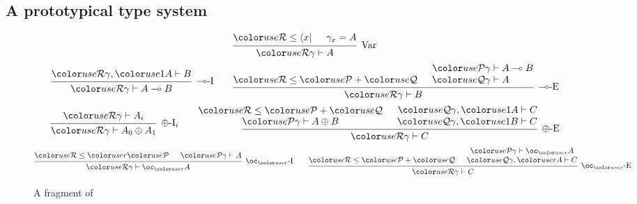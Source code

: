 \subsection{A prototypical type system}

\begin{figure}
  \begin{displaymath}
    \begin{prooftree}
      \hypo{\grR \leq \bra x}
      \hypo{\gamma_x = A}
      \infer2[Var]{\grR\gamma \vdash A}
    \end{prooftree}
  \end{displaymath}
  \begin{displaymath}
    \begin{prooftree}
      \hypo{\grR\gamma, \gr1A \vdash B}
      \infer1[$\multimap$-I]{\grR\gamma \vdash A \multimap B}
    \end{prooftree}
    \qquad
    \begin{prooftree}
      \hypo{\grR \leq \grP + \grQ}
      \hypo{\grP\gamma &\vdash A \multimap B}
      \infer[no rule]1{\grQ\gamma &\vdash A \phantom{{} \multimap B}}
      \infer2[$\multimap$-E]{\grR\gamma \vdash B}
    \end{prooftree}
  \end{displaymath}
  \begin{displaymath}
    \begin{prooftree}
      \hypo{\grR\gamma \vdash A_i}
      \infer1[$\oplus$-I$_i$]{\grR\gamma \vdash A_0 \oplus A_1}
    \end{prooftree}
    \qquad
    \begin{prooftree}
      \hypo{\grR \leq \grP + \grQ}
      \infer[no rule]1{\grP\gamma \vdash A \oplus B}
      \hypo{\grQ\gamma, \gr1A &\vdash C}
      \infer[no rule]1{\grQ\gamma, \gr1B &\vdash C}
      \infer2[$\oplus$-E]{\grR\gamma \vdash C}
    \end{prooftree}
  \end{displaymath}
  \begin{displaymath}
    \begin{prooftree}
      \hypo{\grR \leq \gr r\grP}
      \hypo{\grP\gamma \vdash A}
      \infer2[$\oc_{\gr r}$-I]{\grR\gamma \vdash \oc_{\gr r} A}
    \end{prooftree}
    \qquad
    \begin{prooftree}
      \hypo{\grR \leq \grP + \grQ}
      \hypo{\grP\gamma \vdash \oc_{\gr r} A}
      \infer[no rule]1{\grQ\gamma, \gr rA \vdash C}
      \infer2[$\oc_{\gr r}$-E]{\grR\gamma \vdash C}
    \end{prooftree}
  \end{displaymath}
  \caption{A fragment of \name{}}\label{fig:lr}
\end{figure}


